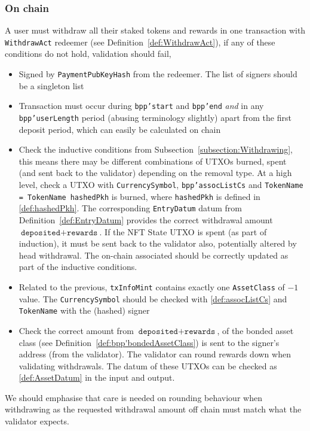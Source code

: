 \documentclass[10pt, a4paper]{article}
\theoremstyle{definition}
\begin{document}
\subsubsection{On chain}\label{subsection:UserWithdrawOnChain}
A user must withdraw all their staked tokens and rewards in one transaction with \texttt{WithdrawAct} redeemer (see Definition~\ref{def:WithdrawAct}), if any of these conditions do not hold, validation should fail, 
\begin{itemize}
\item{Signed by \texttt{PaymentPubKeyHash} from the redeemer. The list of signers should be a singleton list}
\item{Transaction must occur during \texttt{bpp'start} and \texttt{bpp'end} \textit{and} in any \texttt{bpp'userLength} period (abusing terminology slightly) apart from the first deposit period, which can easily be calculated on chain}
\item{Check the inductive conditions from Subsection~\ref{subsection:Withdrawing}, this means there may be different combinations of UTXOs burned, spent (and sent back to the validator) depending on the removal type. At a high level, check a UTXO with \texttt{CurrencySymbol}, \texttt{bpp'assocListCs} and \texttt{TokenName = TokenName hashedPkh} is burned, where \texttt{hashedPkh} is defined in \ref{def:hashedPkh}. The corresponding \texttt{EntryDatum} datum from Definition~\ref{def:EntryDatum} provides the correct withdrawal amount $\texttt{deposited} + \texttt{rewards}$. If the NFT State UTXO is spent (as part of induction), it must be sent back to the validator also, potentially altered by head withdrawal. The on-chain associated should be correctly updated as part of the inductive conditions.}
\item{Related to the previous, \texttt{txInfoMint} contains exactly one \texttt{AssetClass} of $-1$ value. The \texttt{CurrencySymbol} should be checked with \ref{def:assocListCs} and \texttt{TokenName} with the (hashed) signer}
\item{Check the correct amount from $\texttt{deposited} + \texttt{rewards}$, of the bonded asset class (see Definition~\ref{def:bpp'bondedAssetClass}) is sent to the signer's address (from the validator). The validator can round rewards down when validating withdrawals. The datum of these UTXOs can be checked as \ref{def:AssetDatum} in the input and output.} 
\end{itemize}
We should emphasise that care is needed on rounding behaviour when withdrawing as the requested withdrawal amount off chain must match what the validator expects.
\end{document}
